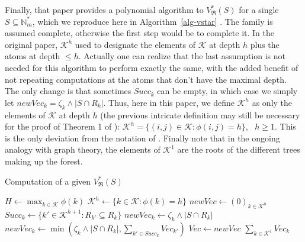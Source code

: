 \documentclass[
  11pt,
  a4paper,
]{article}
\theoremstyle{plain}
\theoremstyle{plain}
\theoremstyle{plain}
\theoremstyle{definition}
\theoremstyle{definition}
\theoremstyle{remark}
\begin{document}
Finally, that paper provides a polynomial algorithm to
\(V^*_{\mathfrak{R}}(S)\) for a single \(S\subseteq\mathbb{N}_m^*\),
which we reproduce here in  Algorithm~\ref{alg-vstar} . The family is
assumed complete, otherwise the first step would be to complete it. In
the original paper, \(\mathcal{K}^h\) used to designate the elements of
\(\mathcal{K}\) at depth \(h\) plus the atoms at depth \(\leq h\).
Actually one can realize that the last assumption is not needed for this
algorithm to perform exactly the same, with the added benefit of not
repeating computations at the atoms that don't have the maximal depth.
The only change is that sometimes \(Succ_k\) can be empty, in which case
we simply let \(newVec_k=\zeta_k\wedge|S\cap R_k|\). Thus, here in this
paper, we define \(\mathcal{K}^h\) as only the elements of
\(\mathcal{K}\) at depth \(h\) (the previous intricate definition may
still be necessary for the proof of Theorem 1 of \citet{MR4178188}):
\(\mathcal{K}^h=\{ (i,j)\in\mathcal{K}: \phi(i,j)=h      \}, \:\:\:h\geq 1.\)
This is the only deviation from the notation of \citet{MR4178188}.
Finally note that in the ongoing analogy with graph theory, the elements
of \(\mathcal{K}^1\) are the roots of the different trees making up the
forest.

\begin{algorithm}[htb!]
\caption{Computation of a given $V^*_{\mathfrak{R}}(S)$}
\label{alg-vstar}
\begin{algorithmic}[1]
  \State $ H \gets \max_{k\in\mathcal{K}} \phi(k)  $ 
    \State $\mathcal{K}^h\gets \{ k\in\mathcal{K} : \phi(k) =h  \}$
    \State $newVec\gets (0)_{k \in  \mathcal{K}^h}$
      \State $Succ_k \gets \{ k' \in  \mathcal{K}^{h+1} : R_{k'}\subseteq R_k\}$
        \State $newVec_k \gets \zeta_k\wedge|S\cap R_k|$
      \Else
        \State $newVec_k \gets \min\left( \zeta_{k}\wedge|S\cap R_k| ,  \sum_{k'\in Succ_k} Vec_{k'}   \right)$
      \EndIf
    \EndFor
    \State $Vec\gets newVec$
  \EndFor
  \State\Return $\sum_{k\in\mathcal{K}^1} Vec_k  $
\EndProcedure
\end{algorithmic}
\end{algorithm}
\end{document}
